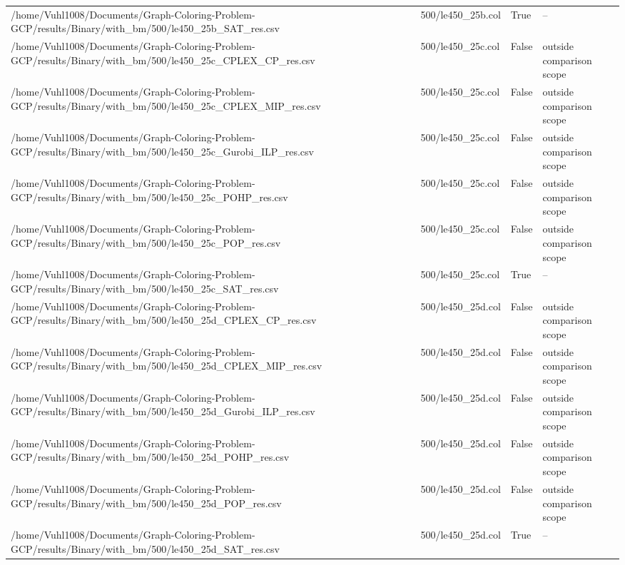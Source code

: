 \begin{table}[htbp]
\begin{tabular}{llll}
/home/Vuhl1008/Documents/Graph-Coloring-Problem-GCP/results/Binary/with\_bm/500/le450\_25b\_SAT\_res.csv & 500/le450\_25b.col & True & -- \\
/home/Vuhl1008/Documents/Graph-Coloring-Problem-GCP/results/Binary/with\_bm/500/le450\_25c\_CPLEX\_CP\_res.csv & 500/le450\_25c.col & False & outside comparison scope \\
/home/Vuhl1008/Documents/Graph-Coloring-Problem-GCP/results/Binary/with\_bm/500/le450\_25c\_CPLEX\_MIP\_res.csv & 500/le450\_25c.col & False & outside comparison scope \\
/home/Vuhl1008/Documents/Graph-Coloring-Problem-GCP/results/Binary/with\_bm/500/le450\_25c\_Gurobi\_ILP\_res.csv & 500/le450\_25c.col & False & outside comparison scope \\
/home/Vuhl1008/Documents/Graph-Coloring-Problem-GCP/results/Binary/with\_bm/500/le450\_25c\_POHP\_res.csv & 500/le450\_25c.col & False & outside comparison scope \\
/home/Vuhl1008/Documents/Graph-Coloring-Problem-GCP/results/Binary/with\_bm/500/le450\_25c\_POP\_res.csv & 500/le450\_25c.col & False & outside comparison scope \\
/home/Vuhl1008/Documents/Graph-Coloring-Problem-GCP/results/Binary/with\_bm/500/le450\_25c\_SAT\_res.csv & 500/le450\_25c.col & True & -- \\
/home/Vuhl1008/Documents/Graph-Coloring-Problem-GCP/results/Binary/with\_bm/500/le450\_25d\_CPLEX\_CP\_res.csv & 500/le450\_25d.col & False & outside comparison scope \\
/home/Vuhl1008/Documents/Graph-Coloring-Problem-GCP/results/Binary/with\_bm/500/le450\_25d\_CPLEX\_MIP\_res.csv & 500/le450\_25d.col & False & outside comparison scope \\
/home/Vuhl1008/Documents/Graph-Coloring-Problem-GCP/results/Binary/with\_bm/500/le450\_25d\_Gurobi\_ILP\_res.csv & 500/le450\_25d.col & False & outside comparison scope \\
/home/Vuhl1008/Documents/Graph-Coloring-Problem-GCP/results/Binary/with\_bm/500/le450\_25d\_POHP\_res.csv & 500/le450\_25d.col & False & outside comparison scope \\
/home/Vuhl1008/Documents/Graph-Coloring-Problem-GCP/results/Binary/with\_bm/500/le450\_25d\_POP\_res.csv & 500/le450\_25d.col & False & outside comparison scope \\
/home/Vuhl1008/Documents/Graph-Coloring-Problem-GCP/results/Binary/with\_bm/500/le450\_25d\_SAT\_res.csv & 500/le450\_25d.col & True & -- \\

\end{tabular}
\end{table}
